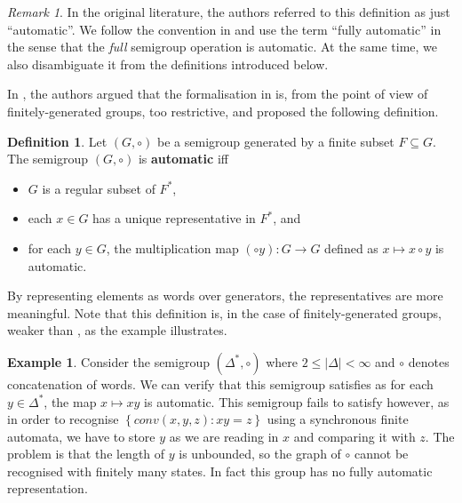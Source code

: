 \documentclass[british,a4paper,11pt,abstract=on]{scrreprt}
\theoremstyle{definition}
\newtheorem{definition}[theorem]{Definition}
\newtheorem{example}[theorem]{Example}
\theoremstyle{remark}
\newtheorem*{remark}{Remark}
\newcommand{\set}[1]{\left\{ #1 \right\}}
\newcommand{\abs}[1]{\left\lvert #1 \right\rvert}
\begin{document}
\begin{remark}
    In the original literature, the authors referred to this definition as just ``automatic''.
    We follow the convention in \autocite{fullautomatatheory} and use the term ``fully automatic'' in the sense that the \textit{full} semigroup operation is automatic.
    At the same time, we also disambiguate it from the definitions introduced below.
\end{remark}

In \autocite{Epstein}, the authors argued that the formalisation in  is, from the point of view of finitely-generated groups, too restrictive, and proposed the following definition.
\begin{definition} \label{automatic group}
    Let \((G,\circ)\) be a semigroup generated by a finite subset \(F\subseteq G\).
    The semigroup \((G,\circ)\) is \textbf{automatic} iff
    \begin{itemize}
        \item \(G\) is a regular subset of \(F^*\),
        \item each \(x\in G\) has a unique representative in \(F^*\), and
        \item for each \(y\in G\), the multiplication map \((\circ y): G\to G\) defined as \(x\mapsto x\circ y\) is automatic.
    \end{itemize}
\end{definition}
By representing elements as words over generators, the representatives are more meaningful.
Note that this definition is, in the case of finitely-generated groups, weaker than , as the example illustrates.
\begin{example}
    Consider the semigroup \((\Delta^*, \circ)\) where \(2\leq \abs{\Delta} <\infty\) and \(\circ\) denotes concatenation of words.
    We can verify that this semigroup satisfies  as for each \(y\in\Delta^*\), the map \(x\mapsto xy\) is automatic.
    This semigroup fails to satisfy  however, as in order to recognise
    \(\set{conv(x,y,z):xy = z}\) using a synchronous finite automata, we have to store \(y\) as we are reading in \(x\) and comparing it with \(z\).
    The problem is that the length of \(y\) is unbounded, so the graph of \(\circ\) cannot be recognised with finitely many states.
    In fact this group has no fully automatic representation.
\end{example}
\end{document}
